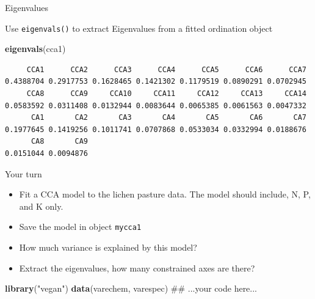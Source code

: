 \documentclass[10pt,ignorenonframetext,compress, aspectratio=169]{beamer}
\newenvironment{Shaded}{\begin{snugshade}}{\end{snugshade}}
\newcommand{\KeywordTok}[1]{\textcolor[rgb]{0.13,0.29,0.53}{\textbf{{#1}}}}
\newcommand{\StringTok}[1]{\textcolor[rgb]{0.31,0.60,0.02}{{#1}}}
\newcommand{\NormalTok}[1]{{#1}}
\begin{document}
\begin{frame}[fragile]{Eigenvalues}

Use \texttt{eigenvals()} to extract Eigenvalues from a fitted ordination
object

\scriptsize

\begin{Shaded}
\begin{Highlighting}[]
\KeywordTok{eigenvals}\NormalTok{(cca1)}
\end{Highlighting}
\end{Shaded}

\begin{verbatim}
     CCA1      CCA2      CCA3      CCA4      CCA5      CCA6      CCA7 
0.4388704 0.2917753 0.1628465 0.1421302 0.1179519 0.0890291 0.0702945 
     CCA8      CCA9     CCA10     CCA11     CCA12     CCA13     CCA14 
0.0583592 0.0311408 0.0132944 0.0083644 0.0065385 0.0061563 0.0047332 
      CA1       CA2       CA3       CA4       CA5       CA6       CA7 
0.1977645 0.1419256 0.1011741 0.0707868 0.0533034 0.0332994 0.0188676 
      CA8       CA9 
0.0151044 0.0094876 
\end{verbatim}

\normalsize

\end{frame}

\begin{frame}[fragile]{Your turn}

\begin{itemize}
\itemsep1pt\parskip0pt
\item
  Fit a CCA model to the lichen pasture data. The model should include,
  N, P, and K only.
\item
  Save the model in object \texttt{mycca1}
\item
  How much variance is explained by this model?
\item
  Extract the eigenvalues, how many constrained axes are there?
\end{itemize}

\begin{Shaded}
\begin{Highlighting}[]
\KeywordTok{library}\NormalTok{(}\StringTok{"vegan"}\NormalTok{)}
\KeywordTok{data}\NormalTok{(varechem, varespec)}
\NormalTok{## ...your code here...}
\end{Highlighting}
\end{Shaded}

\end{frame}
\end{document}
